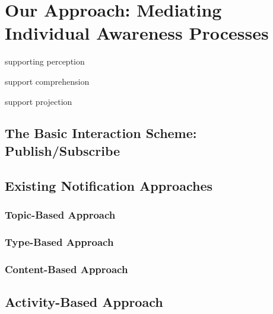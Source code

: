 \graphicspath{{Figures/}}

\chapter{Our Approach: Mediating Individual Awareness Processes} %
\label{cha:mediate_individual_awareness_processes}

supporting perception

support comprehension

support projection

\section{The Basic Interaction Scheme: Publish/Subscribe} %
\label{sec:the_basic_interaction_scheme_publish_subscribe}


\section{Existing Notification Approaches} %
\label{sec:existing_notification_approaches}
\subsection{Topic-Based Approach} %
\label{sub:topic_based_approach}


\subsection{Type-Based Approach} %
\label{sub:type_based_approach}


\subsection{Content-Based Approach} %
\label{sub:content_based_approach}



\section{Activity-Based Approach} %
\label{sec:activity_based_approach}
